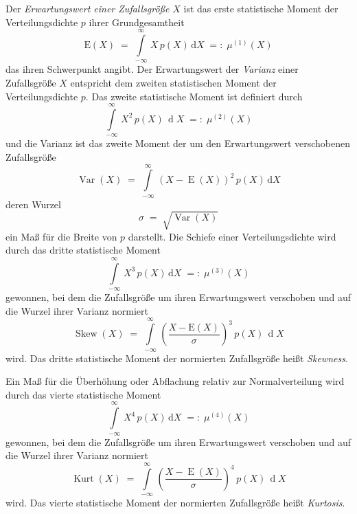 Der \textsl{Erwartungswert einer Zufallsgröße} $X$ ist das erste statistische Moment
der Verteilungsdichte $p$ ihrer Grundgesamtheit
\begin{equation}
\mathrm{E}(X) \; = \; \int\limits_{-\infty}^{\infty} \, X \, p(X) \, \mathrm{d} X \; =: \; \mu^{(1)}(X)
\end{equation}
das ihren Schwerpunkt angibt.
Der Erwartungswert der \textsl{Varianz}
einer Zufallsgröße $X$ entspricht dem zweiten statistischen Moment
der Verteilungsdichte $p$.
Das zweite statistische Moment ist definiert durch
\begin{equation}
\int\limits_{-\infty}^{\infty} \, X^2 \, p(X) \, \operatorname{d} X \; =: \; \mu^{(2)}(X)
\end{equation}
und die Varianz ist das zweite Moment der um den Erwartungswert verschobenen Zufallsgröße
\begin{equation}
\operatorname{Var}(X) \; = \; \int\limits_{-\infty}^{\infty} \, (X - \operatorname{E}(X))^2 \,
 p(X) \, \mathrm{d} X
\end{equation}
deren Wurzel
\begin{equation}
\sigma \; = \; \sqrt{\operatorname{Var}(X)}
\end{equation}
ein Maß für die Breite von $p$ darstellt.
Die Schiefe einer Verteilungsdichte wird durch das dritte statistische Moment
\begin{equation}
\int\limits_{-\infty}^{\infty} \, X^3 \, p(X) \, \mathrm{d} X \; =: \; \mu^{(3)}(X)
\end{equation}
gewonnen, bei dem die Zufallsgröße um ihren Erwartungswert verschoben und auf die Wurzel ihrer
Varianz normiert
\begin{equation}
\operatorname{Skew}(X) \; = \; \int\limits_{-\infty}^{\infty} \, \left(\frac{X - \mathrm{E}(X)}{\sigma}
\right)^3 \, p(X) \, \operatorname{d} X
\end{equation}
wird. Das dritte statistische Moment der normierten Zufallsgröße heißt
\textsl{Skewness}.

Ein Maß für die Überhöhung oder Abflachung relativ zur Normalverteilung wird durch
das vierte statistische Moment
\begin{equation}
\int\limits_{-\infty}^{\infty} \, X^4 \, p(X) \, \mathrm{d} X \; =: \; \mu^{(4)}(X)
\end{equation}
gewonnen, bei dem die Zufallsgröße um ihren Erwartungswert verschoben und auf die Wurzel ihrer
Varianz normiert
\begin{equation}
\operatorname{Kurt}(X) \; = \;  \int\limits_{-\infty}^{\infty} \, \left(\frac{X - \operatorname{E}(X)}{\sigma}
\right)^4 \, p(X) \, \operatorname{d} X
\end{equation}
wird. Das vierte statistische Moment der normierten Zufallsgröße heißt
\textsl{Kurtosis}.

